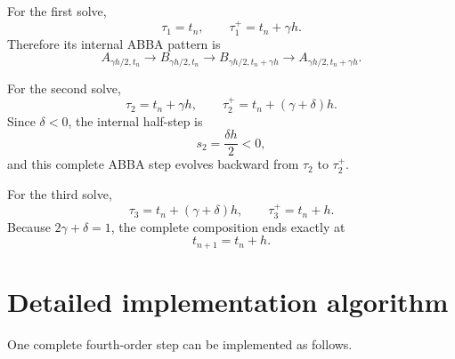 \documentclass[11pt,a4paper]{article}
\begin{document}
For the first solve,
\begin{equation}
    \tau_1=t_n,
    \qquad
    \tau_1^+=t_n+\gamma h.
\end{equation}
Therefore its internal ABBA pattern is
\begin{equation}
    A_{\gamma h/2,t_n}
    \rightarrow
    B_{\gamma h/2,t_n}
    \rightarrow
    B_{\gamma h/2,t_n+\gamma h}
    \rightarrow
    A_{\gamma h/2,t_n+\gamma h}.
\end{equation}

For the second solve,
\begin{equation}
    \tau_2=t_n+\gamma h,
    \qquad
    \tau_2^+=t_n+(\gamma+\delta)h.
\end{equation}
Since $\delta<0$, the internal half-step is
\begin{equation}
    s_2=\frac{\delta h}{2}<0,
\end{equation}
and this complete ABBA step evolves backward from $\tau_2$ to $\tau_2^+$.

For the third solve,
\begin{equation}
    \tau_3=t_n+(\gamma+\delta)h,
    \qquad
    \tau_3^+=t_n+h.
\end{equation}
Because $2\gamma+\delta=1$, the complete composition ends exactly at
\begin{equation}
    t_{n+1}=t_n+h.
\end{equation}

\section{Detailed implementation algorithm}
One complete fourth-order step can be implemented as follows.
\end{document}

